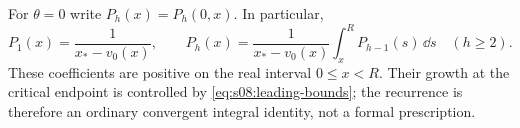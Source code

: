 For $\theta=0$ write $P_h(x)=P_h(0,x)$. In particular,
\begin{equation}\label{eq:s08:principal-recurrence}
 P_1(x)=\frac1{x_*-v_0(x)},\qquad
 P_h(x)=\frac1{x_*-v_0(x)}\int_x^R P_{h-1}(s)\,\dd s
                                      \quad(h\geq2).
\end{equation}
These coefficients are positive on the real interval $0\leq x<R$.
Their growth at the critical endpoint is controlled by
\eqref{eq:s08:leading-bounds}; the recurrence is therefore an
ordinary convergent integral identity, not a formal prescription.
